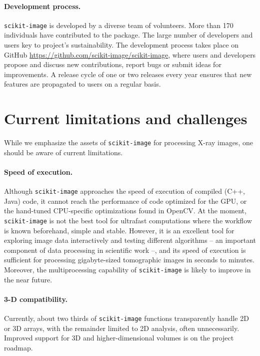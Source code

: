 \documentclass[twocolumn]{bmcart}%
\begin{document}
\paragraph{Development process.}

\texttt{scikit-image} is developed by a diverse team of volunteers.
More than 170 individuals have contributed to the package. The large
number of developers and users key to project's sustainability. The
development process takes place on GitHub
\url{https://github.com/scikit-image/scikit-image}, where users and
developers propose and discuss new contributions, report bugs or submit ideas
for improvements.
A release cycle of one or two releases every year
ensures that new features are propagated to users on a regular basis.

\section*{Current limitations and challenges}

While we emphasize the assets of \texttt{scikit-image} for processing
X-ray images, one should be aware of current limitations.

\paragraph{Speed of execution.} Although \texttt{scikit-image} approaches
the speed of execution of compiled (C++, Java) code, it cannot reach the
performance of code optimized for the GPU, or the hand-tuned
CPU-specific optimizations found in OpenCV. At the moment,
\texttt{scikit-image} is not the best tool for ultrafast computations
where the workflow is known beforehand, simple and stable. However, it is
an excellent tool for exploring image data interactively and testing
different algorithms -- an important component of data processing in
scientific work --, and its speed of execution is sufficient for processing
gigabyte-sized tomographic images in seconds to minutes. Moreover,
the multiprocessing capability of \texttt{scikit-image} is likely to improve in
the near future.

\paragraph{3-D compatibility.} Currently, about two thirds of
\texttt{scikit-image} functions transparently handle 2D or 3D arrays, with
the remainder limited to 2D analysis, often unnecessarily. Improved support
for 3D and higher-dimensional volumes is on the project roadmap.
\end{document}
